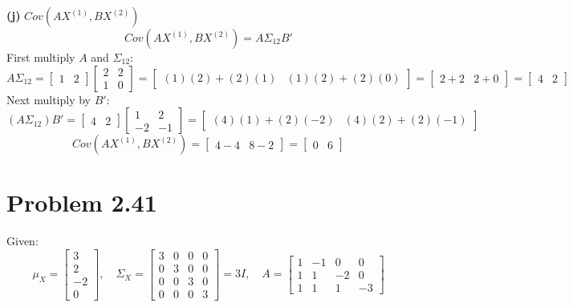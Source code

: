 \documentclass{article}
\begin{document}
\noindent \textbf{(j)} $Cov(AX^{(1)}, BX^{(2)})$
\[
Cov(AX^{(1)}, BX^{(2)}) = A \Sigma_{12} B' 
\]
First multiply $A$ and $\Sigma_{12}$:
\[
A \Sigma_{12} = \begin{bmatrix} 1 & 2 \end{bmatrix} \begin{bmatrix} 2 & 2 \\ 1 & 0 \end{bmatrix} = \begin{bmatrix} (1)(2)+(2)(1) & (1)(2)+(2)(0) \end{bmatrix} = \begin{bmatrix} 2+2 & 2+0 \end{bmatrix} = \begin{bmatrix} 4 & 2 \end{bmatrix}
\]
Next multiply by $B'$:
\[
(A \Sigma_{12}) B' = \begin{bmatrix} 4 & 2 \end{bmatrix} \begin{bmatrix} 1 & 2 \\ -2 & -1 \end{bmatrix} = \begin{bmatrix} (4)(1)+(2)(-2) & (4)(2)+(2)(-1) \end{bmatrix} 
\]
\[
Cov(AX^{(1)}, BX^{(2)}) = \begin{bmatrix} 4-4 & 8-2 \end{bmatrix} = \begin{bmatrix} 0 & 6 \end{bmatrix}
\]

\hrulefill

\section*{Problem 2.41}
Given:
\[
\mu_X = \begin{bmatrix} 3 \\ 2 \\ -2 \\ 0 \end{bmatrix}, \quad
\Sigma_X = \begin{bmatrix} 3 & 0 & 0 & 0 \\ 0 & 3 & 0 & 0 \\ 0 & 0 & 3 & 0 \\ 0 & 0 & 0 & 3 \end{bmatrix} = 3I, \quad
A = \begin{bmatrix} 1 & -1 & 0 & 0 \\ 1 & 1 & -2 & 0 \\ 1 & 1 & 1 & -3 \end{bmatrix}
\]
\end{document}
